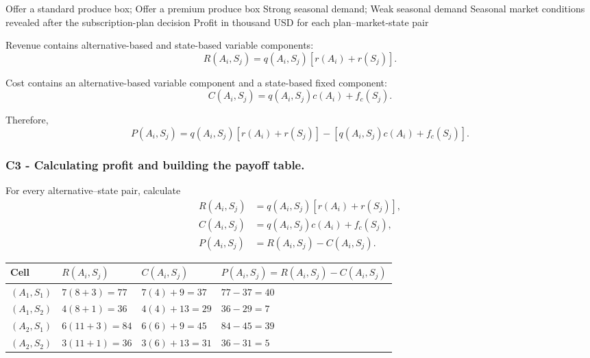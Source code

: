 \DecisionElementsTable
{Offer a standard produce box; Offer a premium produce box}
{Strong seasonal demand; Weak seasonal demand}
{Seasonal market conditions revealed after the subscription-plan decision}
{Profit in thousand USD for each plan--market-state pair}

Revenue contains alternative-based and state-based variable components:
\[
R(A_i,S_j)
=
q(A_i,S_j)
\left[
r(A_i)+r(S_j)
\right].
\]

Cost contains an alternative-based variable component and a state-based
fixed component:
\[
C(A_i,S_j)
=
q(A_i,S_j)c(A_i)+f_c(S_j).
\]

Therefore,
\[
P(A_i,S_j)
=
q(A_i,S_j)
\left[
r(A_i)+r(S_j)
\right]
-
\left[
q(A_i,S_j)c(A_i)+f_c(S_j)
\right].
\]


\subsubsection*{C3 - Calculating profit and building the payoff table.}
\label{subsec:problem9-farm-produce-subscription-c3}

For every alternative--state pair, calculate
\[
\begin{aligned}
	R(A_i,S_j)
	&=
	q(A_i,S_j)
	\left[
	r(A_i)+r(S_j)
	\right],
	\\
	C(A_i,S_j)
	&=
	q(A_i,S_j)c(A_i)+f_c(S_j),
	\\
	P(A_i,S_j)
	&=
	R(A_i,S_j)-C(A_i,S_j).
\end{aligned}
\]

\begin{center}
	\small
	\begin{tabular}{llll}
		\toprule
		Cell
		& \(R(A_i,S_j)\)
		& \(C(A_i,S_j)\)
		& \(P(A_i,S_j)=R(A_i,S_j)-C(A_i,S_j)\) \\
		\midrule
		\((A_1,S_1)\)
		& \(7(8+3)=77\)
		& \(7(4)+9=37\)
		& \(77-37=40\) \\
		
		\((A_1,S_2)\)
		& \(4(8+1)=36\)
		& \(4(4)+13=29\)
		& \(36-29=7\) \\
		
		\((A_2,S_1)\)
		& \(6(11+3)=84\)
		& \(6(6)+9=45\)
		& \(84-45=39\) \\
		
		\((A_2,S_2)\)
		& \(3(11+1)=36\)
		& \(3(6)+13=31\)
		& \(36-31=5\) \\
		\bottomrule
	\end{tabular}
\end{center}

